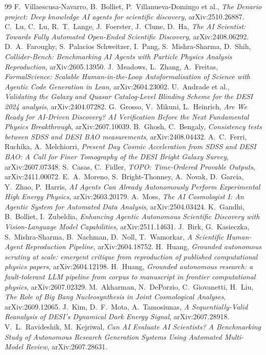 \documentclass[11pt]{article}
\begin{document}
\begin{thebibliography}{99}
 F.~Villaescusa-Navarro, B.~Bolliet, P.~Villanueva-Domingo et al., \emph{The Denario project: Deep knowledge AI agents for scientific discovery}, arXiv:2510.26887.
 C.~Lu, C.~Lu, R.~T.~Lange, J.~Foerster, J.~Clune, D.~Ha, \emph{The AI Scientist: Towards Fully Automated Open-Ended Scientific Discovery}, arXiv:2408.06292.
 D.~A.~Faroughy, S.~Palacios Schweitzer, I.~Pang, S.~Mishra-Sharma, D.~Shih, \emph{Collider-Bench: Benchmarking AI Agents with Particle Physics Analysis Reproduction}, arXiv:2605.13950.
 J.~Meadows, L.~Zhang, A.~Freitas, \emph{FormalScience: Scalable Human-in-the-Loop Autoformalisation of Science with Agentic Code Generation in Lean}, arXiv:2604.23002.
 U.~Andrade et al., \emph{Validating the Galaxy and Quasar Catalog-Level Blinding Scheme for the DESI 2024 analysis}, arXiv:2404.07282.
 G.~Grosso, V.~Mikuni, L.~Heinrich, \emph{Are We Ready for AI-Driven Discovery? AI Verification Before the Next Fundamental Physics Breakthrough}, arXiv:2607.10039.
 B.~Ghosh, C.~Bengaly, \emph{Consistency tests between SDSS and DESI BAO measurements}, arXiv:2408.04432.
 A.~C.~Ferri, Ruchika, A.~Melchiorri, \emph{Present Day Cosmic Acceleration from SDSS and DESI BAO: A Call for Finer Tomography of the DESI Bright Galaxy Survey}, arXiv:2607.07348.
 S.~Casas, C.~Fidler, \emph{TOPO: Time-Ordered Provable Outputs}, arXiv:2411.00072.
 E.~A.~Moreno, S.~Bright-Thonney, A.~Novak, D.~Garcia, Y.~Zhao, P.~Harris, \emph{AI Agents Can Already Autonomously Perform Experimental High Energy Physics}, arXiv:2603.20179.
 A.~Moss, \emph{The AI Cosmologist I: An Agentic System for Automated Data Analysis}, arXiv:2504.03424.
 K.~Gandhi, B.~Bolliet, I.~Zubeldia, \emph{Enhancing Agentic Autonomous Scientific Discovery with Vision-Language Model Capabilities}, arXiv:2511.14631.
 J.~Birk, G.~Kasieczka, S.~Mishra-Sharma, B.~Nachman, D.~Noll, T.~Wamorkar, \emph{A Scientific Human-Agent Reproduction Pipeline}, arXiv:2604.18752.
 H.~Huang, \emph{Grounded autonomous scrutiny at scale: emergent critique from reproduction of published computational physics papers}, arXiv:2604.12198.
 H.~Huang, \emph{Grounded autonomous research: a fault-tolerant LLM pipeline from corpus to manuscript in frontier computational physics}, arXiv:2607.02329.
 M.~Akharman, N.~DePorzio, C.~Giovanetti, H.~Liu, \emph{The Role of Big Bang Nucleosynthesis in Joint Cosmological Analyses}, arXiv:2609.12065.
 J.~Kim, D.~F.~Mota, A.~Tamosiunas, \emph{A Sequentially-Valid Reanalysis of DESI's Dynamical Dark Energy Signal}, arXiv:2607.28918.
 V.~L.~Ravideshik, M.~Kejriwal, \emph{Can AI Evaluate AI Scientists? A Benchmarking Study of Autonomous Research Generation Systems Using Automated Multi-Model Review}, arXiv:2607.28631.
\end{thebibliography}
\end{document}
